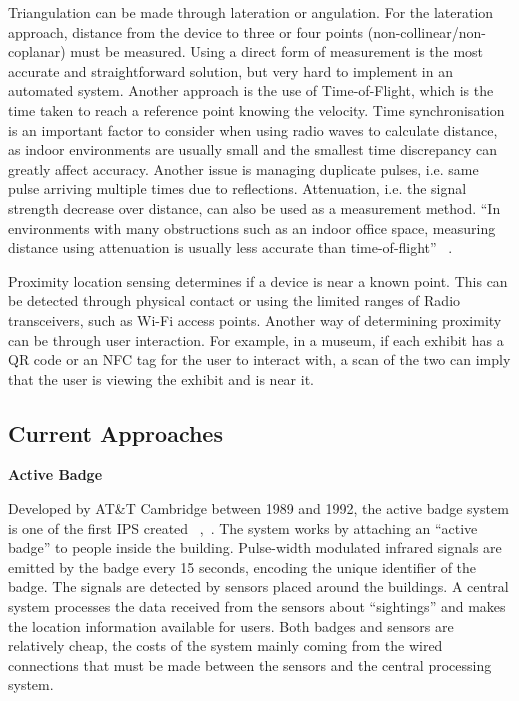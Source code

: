 Triangulation can be made through lateration or angulation. For the lateration approach, distance from the device to three or four points (non-collinear/non-coplanar) must be measured. Using a direct form of measurement is the most accurate and straightforward solution, but very hard to implement in an automated system. Another approach is the use of Time-of-Flight, which is the time taken to reach a reference point knowing the velocity. Time synchronisation is an important factor to consider when using radio waves to calculate distance, as indoor environments are usually small and the smallest time discrepancy can greatly affect accuracy. Another issue is managing duplicate pulses, i.e. same pulse arriving multiple times due to reflections. Attenuation, i.e. the signal strength decrease over distance, can also be used as a measurement method. “In environments with many obstructions such as an indoor office space, measuring distance using attenuation is usually less accurate than time-of-flight” ~\cite{Hightower}.

Proximity location sensing determines if a device is near a known point. This can be detected through physical contact or using the limited ranges of Radio transceivers, such as Wi-Fi access points. Another way of determining proximity can be through user interaction. For example, in a museum, if each exhibit has a QR code or an NFC tag for the user to interact with, a scan of the two can imply that the user is viewing the exhibit and is near it.
\subsection{Current Approaches}

\noindent \textbf{Active Badge}

Developed by AT\&T Cambridge between 1989 and 1992, the active badge system is one of the first IPS created ~\cite{Want},~\cite{ActiveBadge}. The system works by attaching an “active badge” to people inside the building. Pulse-width modulated infrared signals are emitted by the badge every 15 seconds, encoding the unique identifier of the badge. The signals are detected by sensors placed around the buildings. A central system processes the data received from the sensors about “sightings” and makes the location information available for users. Both badges and sensors are relatively cheap, the costs of the system mainly coming from the wired connections that must be made between the sensors and the central processing system. 

